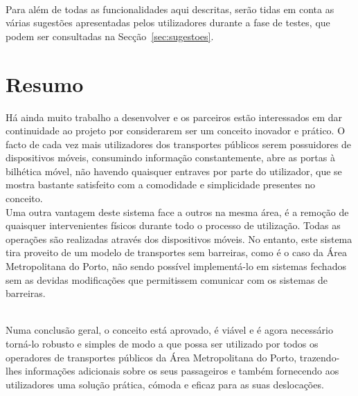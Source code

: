 ~\\Para além de todas as funcionalidades aqui descritas, serão tidas em conta as várias sugestões apresentadas pelos utilizadores durante a fase de testes, que podem ser consultadas na Secção~\ref{sec:sugestoes}.

\section{Resumo}

Há ainda muito trabalho a desenvolver e os parceiros estão interessados em dar continuidade ao projeto por considerarem ser um conceito inovador e prático. O facto de cada vez mais utilizadores dos transportes públicos serem possuidores de dispositivos móveis, consumindo informação constantemente, abre as portas à bilhética móvel, não havendo quaisquer entraves por parte do utilizador, que se mostra bastante satisfeito com a comodidade e simplicidade presentes no conceito.
\\Uma outra vantagem deste sistema face a outros na mesma área, é a remoção de quaisquer intervenientes físicos durante todo o processo de utilização. Todas as operações são realizadas através dos dispositivos móveis. No entanto, este sistema tira proveito de um modelo de transportes sem barreiras, como é o caso da Área Metropolitana do Porto, não sendo possível implementá-lo em sistemas fechados sem as devidas modificações que permitissem comunicar com os sistemas de barreiras.

~\\Numa conclusão geral, o conceito está aprovado, é viável e é agora necessário torná-lo robusto e simples de modo a que possa ser utilizado por todos os operadores de transportes públicos da Área Metropolitana do Porto, trazendo-lhes informações adicionais sobre os seus passageiros e também fornecendo aos utilizadores uma solução prática, cómoda e eficaz para as suas deslocações.